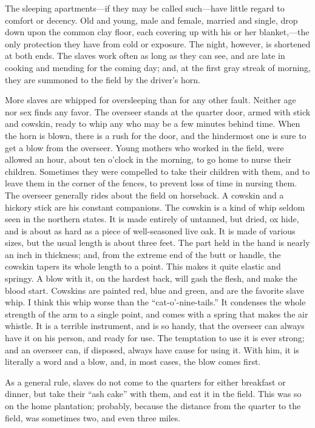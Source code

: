 The sleeping apartments---if they may be called such---have little
regard to comfort or decency. Old and young, male and female, married
and single, drop down upon the common clay floor, each covering up with
his or her blanket,---the only protection they have from cold or
exposure. The night, however, is shortened at both ends. The slaves work
often as long as they can see, and are late in cooking and mending for
the coming day; and, at the first gray streak of morning, they are
summoned to the field by the driver's horn.

More slaves are whipped for oversleeping than for any other fault.
Neither age nor sex finds any favor. The overseer stands at the quarter
door, armed with stick and cowskin, ready to whip any who may be a few
minutes behind time. When the horn is blown, there is a rush for the
door, and the hindermost one is sure to get a blow from the overseer.
Young mothers who worked in the field, were allowed an hour, about ten
o'clock in the morning, to go home to nurse their children. Sometimes
they were compelled to take their children with them, and to leave them
in the {\protect\hypertarget{103}{}{}}corner of the fences, to prevent
loss of time in nursing them. The overseer generally rides about the
field on horseback. A cowskin and a hickory stick are his constant
companions. The cowskin is a kind of whip seldom seen in the northern
states. It is made entirely of untanned, but dried, ox hide, and is
about as hard as a piece of well-seasoned live oak. It is made of
various sizes, but the usual length is about three feet. The part held
in the hand is nearly an inch in thickness; and, from the extreme end of
the butt or handle, the cowskin tapers its whole length to a point. This
makes it quite elastic and springy. A blow with it, on the hardest back,
will gash the flesh, and make the blood start. Cowskins are painted red,
blue and green, and are the favorite slave whip. I think this whip worse
than the ``cat-o'-nine-tails.'' It condenses the whole strength of the
arm to a single point, and comes with a spring that makes the air
whistle. It is a terrible instrument, and is so handy, that the overseer
can always have it on his person, and ready for use. The temptation to
use it is ever strong; and an overseer can, if disposed, always have
cause for using it. With him, it is literally a word and a blow, and, in
most cases, the blow comes first.

As a general rule, slaves do not come to the quarters for either
breakfast or dinner, but take their ``ash cake'' with them, and eat it
in the field. This was so on the home plantation; probably, because the
distance from the quarter to the field, was sometimes two, and even
three miles.

